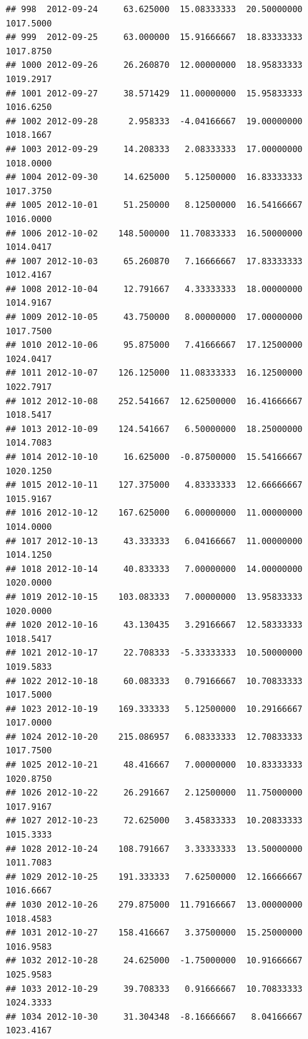 \documentclass[
]{article}
\begin{document}
\begin{verbatim}
## 998  2012-09-24     63.625000  15.08333333  20.50000000    1017.5000
## 999  2012-09-25     63.000000  15.91666667  18.83333333    1017.8750
## 1000 2012-09-26     26.260870  12.00000000  18.95833333    1019.2917
## 1001 2012-09-27     38.571429  11.00000000  15.95833333    1016.6250
## 1002 2012-09-28      2.958333  -4.04166667  19.00000000    1018.1667
## 1003 2012-09-29     14.208333   2.08333333  17.00000000    1018.0000
## 1004 2012-09-30     14.625000   5.12500000  16.83333333    1017.3750
## 1005 2012-10-01     51.250000   8.12500000  16.54166667    1016.0000
## 1006 2012-10-02    148.500000  11.70833333  16.50000000    1014.0417
## 1007 2012-10-03     65.260870   7.16666667  17.83333333    1012.4167
## 1008 2012-10-04     12.791667   4.33333333  18.00000000    1014.9167
## 1009 2012-10-05     43.750000   8.00000000  17.00000000    1017.7500
## 1010 2012-10-06     95.875000   7.41666667  17.12500000    1024.0417
## 1011 2012-10-07    126.125000  11.08333333  16.12500000    1022.7917
## 1012 2012-10-08    252.541667  12.62500000  16.41666667    1018.5417
## 1013 2012-10-09    124.541667   6.50000000  18.25000000    1014.7083
## 1014 2012-10-10     16.625000  -0.87500000  15.54166667    1020.1250
## 1015 2012-10-11    127.375000   4.83333333  12.66666667    1015.9167
## 1016 2012-10-12    167.625000   6.00000000  11.00000000    1014.0000
## 1017 2012-10-13     43.333333   6.04166667  11.00000000    1014.1250
## 1018 2012-10-14     40.833333   7.00000000  14.00000000    1020.0000
## 1019 2012-10-15    103.083333   7.00000000  13.95833333    1020.0000
## 1020 2012-10-16     43.130435   3.29166667  12.58333333    1018.5417
## 1021 2012-10-17     22.708333  -5.33333333  10.50000000    1019.5833
## 1022 2012-10-18     60.083333   0.79166667  10.70833333    1017.5000
## 1023 2012-10-19    169.333333   5.12500000  10.29166667    1017.0000
## 1024 2012-10-20    215.086957   6.08333333  12.70833333    1017.7500
## 1025 2012-10-21     48.416667   7.00000000  10.83333333    1020.8750
## 1026 2012-10-22     26.291667   2.12500000  11.75000000    1017.9167
## 1027 2012-10-23     72.625000   3.45833333  10.20833333    1015.3333
## 1028 2012-10-24    108.791667   3.33333333  13.50000000    1011.7083
## 1029 2012-10-25    191.333333   7.62500000  12.16666667    1016.6667
## 1030 2012-10-26    279.875000  11.79166667  13.00000000    1018.4583
## 1031 2012-10-27    158.416667   3.37500000  15.25000000    1016.9583
## 1032 2012-10-28     24.625000  -1.75000000  10.91666667    1025.9583
## 1033 2012-10-29     39.708333   0.91666667  10.70833333    1024.3333
## 1034 2012-10-30     31.304348  -8.16666667   8.04166667    1023.4167

\end{verbatim}
\end{document}
